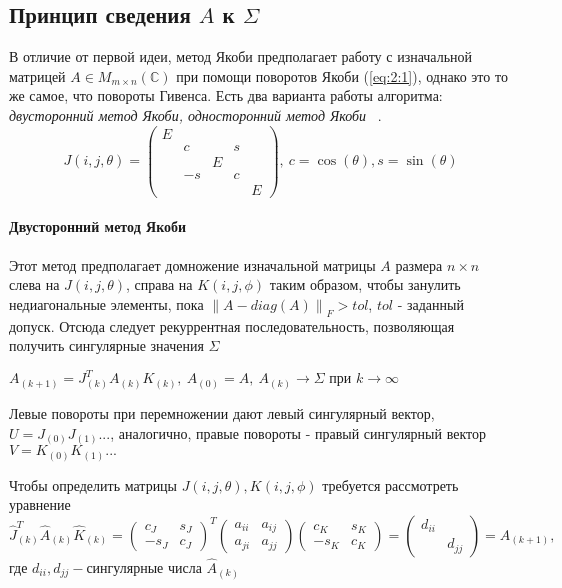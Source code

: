 \subsection{Принцип сведения $A$ к $\Sigma$}
В отличие от первой идеи, метод Якоби предполагает работу с изначальной матрицей $A\in M_{m\times n}(\mathbb{C})$ при помощи поворотов Якоби (\ref{eq:2:1}), однако это то же самое, что повороты Гивенса. Есть два варианта работы алгоритма:\textit{ двусторонний метод Якоби, односторонний метод Якоби} ~\cite{Dongarra2018}.
\begin{equation} \label{eq:2:1}
    J(i,j,\theta) = 
    \begin{pmatrix}E&&&&\\
        &c&&s\\
        &&E&&\\
        &-s&&c\\
        &&&&E
    \end{pmatrix},\
    c = \cos(\theta), s =\sin(\theta) 
\end{equation}
\paragraph{Двусторонний метод Якоби}
Этот метод предполагает домножение изначальной матрицы $A$ размера $n\times n \ $ слева на $J(i,j,\theta)$, справа на $K(i,j,\phi)$ таким образом, чтобы занулить недиагональные элементы, пока $\left\| A - diag(A) \right\|_F > tol$, $tol$ - заданный допуск. 
Отсюда следует рекуррентная последовательность, позволяющая получить сингулярные значения $\Sigma$
\begin{center}
    $A_{(k+1)} = J^T_{(k)}A_{(k)}K_{(k)}, \ A_{(0)}= A, \ A_{(k)}\longrightarrow\Sigma \text{ при } k\to\infty$
\end{center}

Левые повороты при перемножении дают левый сингулярный вектор, $U=J_{(0)}J_{(1)}...$, аналогично, правые повороты - правый сингулярный вектор $V=K_{(0)}K_{(1)}...$

Чтобы определить матрицы $J(i,j,\theta), K(i,j,\phi)$ требуется рассмотреть уравнение
\begin{equation}
    \hat{J}_{(k)}^T\hat{A}_{(k)}\hat{K}_{(k)} = \begin{pmatrix}
        c_J&s_J\\
        -s_J&c_J
    \end{pmatrix}^T
    \begin{pmatrix}
        a_{ii}&a_{ij}\\
        a_{ji}&a_{jj}
    \end{pmatrix}
    \begin{pmatrix}
        c_K&s_K\\
        -s_K&c_K
    \end{pmatrix} = \begin{pmatrix}
        d_{ii} &\\
        &d_{jj}
    \end{pmatrix} = A_{(k+1)},
\end{equation}
где $d_{ii}, d_{jj} -\text{сингулярные числа } \hat{A}_{(k)}$

